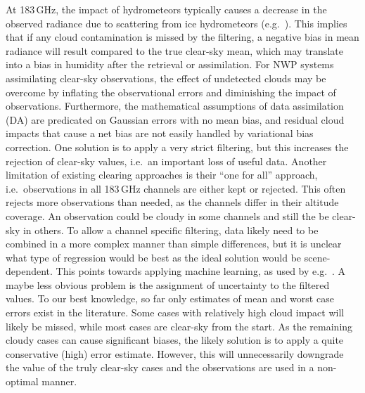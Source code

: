 \documentclass[amt, manuscript]{copernicus}
\begin{document}
At 183\,GHz, the impact of hydrometeors typically causes a decrease in the observed radiance due to scattering from ice hydrometeors (e.g.\ \citet{barlakas:three:20}). This implies that if any cloud contamination is missed by the filtering, a negative bias in mean radiance will result compared to the true clear-sky mean, which may translate into a bias in humidity after the retrieval or assimilation. For NWP systems assimilating clear-sky observations, the effect of undetected clouds may be overcome by inflating the observational errors and diminishing the impact of observations. Furthermore, the mathematical assumptions of data assimilation (DA) are predicated on Gaussian errors with no mean bias, and residual cloud impacts that cause a net bias are not easily handled by variational bias correction. One solution is to apply a very strict filtering, but this increases the rejection of clear-sky values, i.e.\ an important loss of useful data. Another limitation of existing clearing approaches is their ``one for all'' approach, i.e.\ observations in all 183\,GHz channels are either kept or rejected. This often rejects more observations than needed, as the channels differ in their altitude coverage. An observation could be cloudy in some channels and still the be clear-sky in others. To allow a channel specific filtering, data likely need to be combined in a more complex manner than simple differences, but it is unclear what type of regression would be best as the ideal solution would be scene-dependent. This points towards applying machine learning, as used by e.g.\ \citet{favrichon2019detecting}. A maybe less obvious problem is the assignment of uncertainty to the filtered values. To our best knowledge, so far only estimates of mean and worst case errors exist in the literature. Some cases with relatively high cloud impact will likely be missed, while most cases are clear-sky from the start. As the remaining cloudy cases can cause significant biases, the likely solution is to apply a quite conservative (high) error estimate. However, this will unnecessarily downgrade the value of the truly clear-sky cases and the observations are used in a non-optimal manner.
\end{document}
